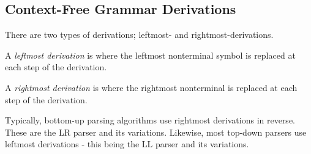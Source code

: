 \subsection{Context-Free Grammar Derivations}
There are two types of derivations; leftmost- and rightmost-derivations\cite{sebesta_concepts_2016}.

A \textit{leftmost derivation} is where the leftmost nonterminal symbol is replaced at each step of the derivation.

A \textit{rightmost derivation} is where the rightmost nonterminal is replaced at each step of the derivation.

Typically, bottom-up parsing algorithms use rightmost derivations in reverse. These are the LR parser and its variations. Likewise, most top-down parsers use leftmost derivations - this being the LL parser and its variations.